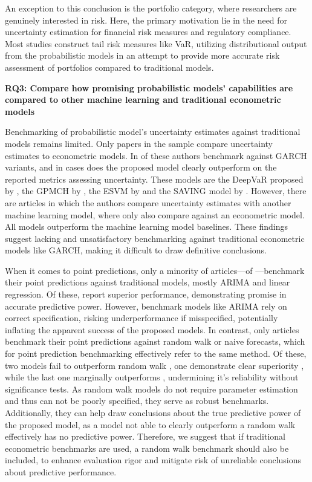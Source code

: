 An exception to this conclusion is the portfolio category, where researchers are genuinely interested in risk. Here, the primary motivation lie in the need for uncertainty estimation for financial risk measures and regulatory compliance. Most studies construct tail risk measures like VaR, utilizing distributional output from the probabilistic models in an attempt to provide more accurate risk assessment of portfolios compared to traditional models.

\textbf{RQ3: Compare how promising probabilistic models' capabilities are compared to other machine learning and traditional econometric models}\nopagebreak

Benchmarking of probabilistic model's uncertainty estimates against traditional models remains limited. Only \uqpredtradbench papers in the sample compare uncertainty estimates to econometric models. In \uqpredtradbenchgarch of these authors benchmark against GARCH variants, and in \uqpredtradbenchgarchoutperform cases does the proposed model clearly outperform on the reported metrics assessing uncertainty. These models are the DeepVaR proposed by \textcite{Fatouros2023DeepVaR}, the GPMCH by \textcite{Platanios2014gpr}, the ESVM by \textcite{Parker2021BayesianHeteroskedastic} and the SAVING model by \textcite{xing2019sentiment}. However, there are \uqpredMLbench articles in which the authors compare uncertainty estimates with another machine learning model, where only \uqpredboth also compare against an econometric model. All models outperform the machine learning model baselines. These findings suggest lacking and unsatisfactory benchmarking against traditional econometric models like GARCH, making it difficult to draw definitive conclusions.

When it comes to point predictions, only a minority of articles—\pointpredtradbench of \samplesize—benchmark their point predictions against traditional models, mostly ARIMA and linear regression. Of these, \pointpredtradbenchoutp report superior performance, demonstrating promise in accurate predictive power. However, benchmark models like ARIMA rely on correct specification, risking underperformance if misspecified, potentially inflating the apparent success of the proposed models. In contrast, only \rwornaiveforecastbench articles benchmark their point predictions against random walk or naive forecasts, which for point prediction benchmarking effectively refer to the same method. Of these, two models fail to outperform random walk \parencite{hortua2024forecasting, eriolu2020bootstrapped}, one demonstrate clear superiority \parencite{Papaioannou2022gpr}, while the last one marginally outperforms \parencite{Thawornwong2004pnn}, undermining it's reliability without significance tests. As random walk models do not require parameter estimation and thus can not be poorly specified, they serve as robust benchmarks. Additionally, they can help draw conclusions about the true predictive power of the proposed model, as a model not able to clearly outperform a random walk effectively has no predictive power. Therefore, we suggest that if traditional econometric benchmarks are used, a random walk benchmark should also be included, to enhance evaluation rigor and mitigate risk of unreliable conclusions about predictive performance.

